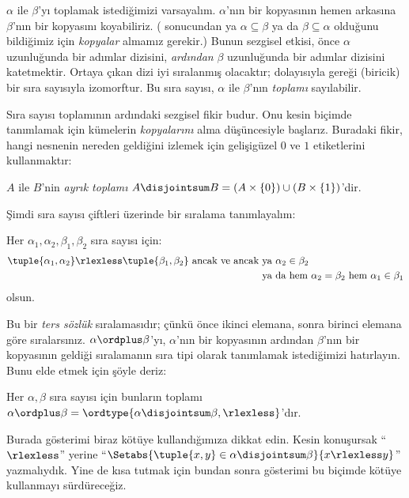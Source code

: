 


$\alpha$ ile $\beta$'yı toplamak istediğimizi varsayalım. $\alpha$'nın bir
kopyasının hemen arkasına $\beta$'nın bir {kopyasını} koyabiliriz.
( sonucundan ya
$\alpha\subseteq\beta$ ya da $\beta\subseteq\alpha$ olduğunu bildiğimiz
için 
\emph{kopyalar} almamız gerekir.) Bunun sezgisel etkisi, önce
$\alpha$ uzunluğunda bir adımlar dizisini, 
\emph{ardından} $\beta$
uzunluğunda bir adımlar dizisini katetmektir. Ortaya çıkan dizi iyi
sıralanmış olacaktır; dolayısıyla
 gereği (biricik) bir
sıra sayısıyla izomorftur. Bu sıra sayısı, $\alpha$ ile $\beta$'nın
\emph{toplamı} sayılabilir.

Sıra sayısı toplamının ardındaki sezgisel fikir budur. Onu kesin biçimde
tanımlamak için kümelerin \emph{kopyalarını} alma düşüncesiyle başlarız.
Buradaki fikir, hangi nesnenin nereden geldiğini izlemek için gelişigüzel
$0$ ve $1$ etiketlerini kullanmaktır:

\begin{defn}
$A$ ile $B$'nin 
\emph{ayrık toplamı}
$A\disjointsum B=(A\times\{0\})\cup(B\times\{1\})$'dir.
\end{defn}

Şimdi sıra sayısı çiftleri üzerinde bir sıralama tanımlayalım:

\begin{defn}
Her $\alpha_1,\alpha_2,\beta_1,\beta_2$ sıra sayısı için:
\begin{align*}
	\tuple{\alpha_1, \alpha_2} \rlexless \tuple{\beta_1, \beta_2}
	\text{ ancak ve ancak }& 
	\text{ya $\alpha_2 \in \beta_2$}\\
	& \text{ya da hem $\alpha_2 = \beta_2$ hem $\alpha_1 \in \beta_1$}
\end{align*}
olsun.
\end{defn}

Bu bir 
\emph{ters sözlük} sıralamasıdır; çünkü önce ikinci elemana, sonra
birinci elemana göre sıralarsınız. $\alpha\ordplus\beta$'yı,
$\alpha$'nın bir kopyasının ardından $\beta$'nın bir kopyasının geldiği
sıralamanın sıra tipi olarak tanımlamak istediğimizi hatırlayın. Bunu elde
etmek için şöyle deriz:

\begin{defn}
Her $\alpha,\beta$ sıra sayısı için bunların toplamı
$\alpha\ordplus\beta=\ordtype{\alpha\disjointsum\beta,\rlexless}$'dır.
\end{defn}
\noindent
Burada gösterimi biraz kötüye kullandığımıza dikkat edin. Kesin konuşursak
``$\rlexless$'' yerine
``$\Setabs{\tuple{x,y}\in\alpha\disjointsum\beta}{x\rlexless y}$''
yazmalıydık. Yine de kısa tutmak için bundan sonra gösterimi bu biçimde
kötüye kullanmayı sürdüreceğiz.

